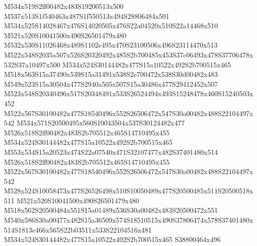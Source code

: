 \documentclass{article}
\begin{document}
\begin{multicols}{2}




M534x519S2ff00482x483S19200513x500 M537x513S1f540463x487S1f550513x494S28806484x501 M534x525S14028467x476S14020505x476S22a04520x510S22a14468x510 M521x520S10041500x490S26501479x480 M532x530S11026468x489S1102e495x470S23100506x496S23114470x513 M522x548S2035a507x526S20320492x485S2b700485x453S37c06493x478S37706478x532S37a10497x500 M534x524S30144482x477S15a10522x492S2b700515x465 M518x563S15a37490x539S15a31491x538S2e700472x538S30d00482x483 M549x523S15a30504x477S2940a505x507S15a30486x477S29412452x507 M523x548S20340496x517S20348491x533S26524494x493S15248478x460S15240503x452 M522x567S30100482x477S18540496x552S26506472x547S30a00482x488S22104497x542 M534x571S20500495x560S10043504x537S30124482x477 M526x518S2ff00482x483S2b705512x465S14710495x455 M534x524S30144482x477S15a10522x492S2b700515x465 M553x534S15a20523x474S22a07540x471S32107477x482S37401480x514 M526x518S2ff00482x483S2b705512x465S14710495x455 M522x567S30100482x477S18540496x552S26506472x547S30a00482x488S22104497x542 M528x524S10058473x477S26526498x510S10050489x477S20500485x511S20500518x511 M521x520S10041500x490S26501479x480 M518x562S20500484x551S15a01489x536S30a00482x483S20500472x551 M540x586S30a00477x482S15a36509x574S18510515x490S37806474x578S37401480x514S1813e466x565S22b03511x533S22104516x481 M534x524S30144482x477S15a10522x492S2b700515x465 S38800464x496


\end{multicols}
\end{document}
